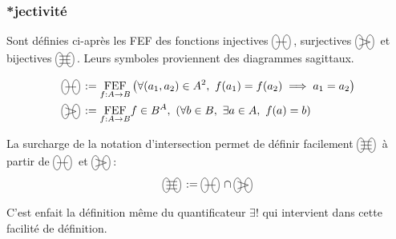 \documentclass{article}
\newcommand{\FEF}[1]{\underset{f:A\to B}{\text{FEF}}#1}
\newcommand{\bijections}{%
	\begin{tikzpicture}[scale=1.5, baseline=-0.5ex]%
		\draw (-0.75ex,0) ellipse (0.5ex and 1ex);
		\draw (0.75ex,0) ellipse (0.5ex and 1ex);
		\draw (-0.75ex,0.5ex) -- (0.75ex,0.5ex);
		\draw (-0.75ex,0) -- (0.75ex,0);
		\draw (-0.75ex,-0.5ex) -- (0.75ex,-0.5ex);
	\end{tikzpicture}\,%
}
\newcommand{\injections}{%
	\begin{tikzpicture}[scale=1.5, baseline=-0.5ex]%
		\draw (-0.75ex,0) ellipse (0.5ex and 1ex);
		\draw (0.75ex,0) ellipse (0.5ex and 1ex);
		\draw (-0.75ex,0) -- (0.75ex,0);
	\end{tikzpicture}\,%
}
\newcommand{\surjections}{%
	\begin{tikzpicture}[scale=1.5, baseline=-0.5ex]%
		\draw (-0.75ex,0) ellipse (0.5ex and 1ex);
		\draw (0.75ex,0) ellipse (0.5ex and 1ex);
		\draw (-0.75ex,0.5ex) -- (0.75ex,0);
		\draw (-0.75ex,-0.5ex) -- (0.75ex,0);
	\end{tikzpicture}\,%
}
\begin{document}
\subsubsection{*jectivité}

Sont définies ci-après les FEF des fonctions injectives $\injections$, surjectives $\surjections$ et bijectives $\bijections$. Leurs symboles proviennent des diagrammes sagittaux.

\begin{align*}
	\injections &:= \FEF{\left( \forall (a_1,a_2)\in A^2,\ f(a_1)=f(a_2)\implies a_1 = a_2 \right)} \\
	\surjections &:= \FEF{f\in B^A,\ \left( \forall b\in B,\ \exists a\in A,\ f(a)=b \right)}\\
\end{align*}

La surcharge de la notation d'intersection permet de définir facilement $\bijections$ à partir de $\injections$ et $\surjections$: 
\[
	\bijections := \injections \cap \surjections
\] 

C'est enfait la définition même du quantificateur $\exists!$ qui intervient dans cette facilité de définition.

\newpage
\tableofcontents
\end{document}
